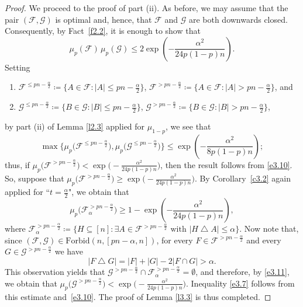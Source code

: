 \documentclass[10pt,a4paper]{amsart}
\theoremstyle{remark}
\newcommand{\meg}{\geqslant}
\newcommand{\mik}{\leqslant}
\newcommand{\Fcal}{\mathcal{F}}
\newcommand{\Gcal}{\mathcal{G}}
\newcommand{\Forb}[2]{\mathrm{Forbid}\left(#1,#2\right)}
\begin{document}
\begin{proof}
We proceed to the proof of part (ii). As before, we may assume that the pair $(\Fcal,\Gcal)$ is optimal
and, hence, that $\Fcal$ and $\Gcal$ are both downwards closed. Consequently, by Fact~\ref{f2.2},
it is enough to show that
\begin{equation} \label{e3.9}
\mu_{p}(\Fcal)\, \mu_{p}(\Gcal)\mik 2 \exp\left(-\frac{\alpha^2}{24p(1-p)n}\right).
\end{equation}
Setting
\begin{enumerate}
\item[$\bullet$] $\Fcal^{\mik pn-\frac{\alpha}{2}}\coloneqq \{A\in \Fcal: |A|\mik pn-\frac{\alpha}{2}\}$,
$\Fcal^{>pn-\frac{\alpha}{2}}\coloneqq \{A\in \Fcal : |A|>pn-\frac{\alpha}{2}\}$, and
\item[$\bullet$] $\Gcal^{\mik pn-\frac{\alpha}{2}}\coloneqq \{B\in \Gcal : |B|\mik pn-\frac{\alpha}{2}\}$,
$\Gcal^{>pn-\frac{\alpha}{2}}\coloneqq \{B\in \Gcal : |B|>pn-\frac{\alpha}{2}\}$,
\end{enumerate}
by part (ii) of Lemma \ref{l2.3} applied for $\mu_{1-p}$, we see that
\begin{equation} \label{e3.10}
\max\big\{ \mu_{p}\big(\Fcal^{\mik pn-\frac{\alpha}{2}}\big),
\mu_{p}\big(\Gcal^{\mik pn-\frac{\alpha}{2}}\big)\big\} \mik
\exp\left(-\frac{\alpha^2}{8p(1-p)n}\right);
\end{equation}
thus, if $\mu_{p}\big(\Fcal^{> pn-\frac{\alpha}{2}}\big)<\exp\big(-\frac{\alpha^2}{24p(1-p)n}\big)$,
then the result follows from \eqref{e3.10}. So, suppose that
$\mu_{p}\big(\Fcal^{>pn-\frac{\alpha}{2}}\big)\meg \exp\big(-\frac{\alpha^2}{24p(1-p)n}\big)$.
By Corollary~\ref{c3.2} again applied for ``$t=\frac{\alpha}{2}$", we obtain that
\begin{equation} \label{e3.11}
\mu_{p}\big(\Fcal^{>pn-\frac{\alpha}{2}}_\alpha\big)\meg
1-\exp\left(-\frac{\alpha^2}{24p(1-p)n}\right),
\end{equation}
where $\Fcal^{>pn-\frac{\alpha}{2}}_\alpha\coloneqq \{H\subseteq [n]:
\exists A\in \Fcal^{>pn-\frac{\alpha}{2}} \text{ with } |H\bigtriangleup A|\mik \alpha\}$.
Now note that, since $(\Fcal,\Gcal)\in\Forb{n}{[pn-\alpha,n]}$, for every
$F\in \Fcal^{> pn-\frac{\alpha}{2}}$ and every $G\in \Gcal^{> pn-\frac{\alpha}{2}}$ we have
\begin{equation} \label{e3.12}
|F\bigtriangleup G|=|F|+|G|-2|F\cap G|>\alpha.
\end{equation}
This observation yields that $\Gcal^{> pn-\frac{\alpha}{2}}\cap \Fcal^{> pn-\frac{\alpha}{2}}_\alpha=\emptyset$,
and therefore, by \eqref{e3.11}, we obtain that
$\mu_{p}\big(\Gcal^{> pn-\frac{\alpha}{2}}\big)<\exp\big(-\frac{\alpha^2}{24p(1-p)n}\big)$.
Inequality \eqref{e3.7} follows from this estimate and~\eqref{e3.10}.
The proof of Lemma \ref{l3.3} is thus completed.
\end{proof}
\end{document}
